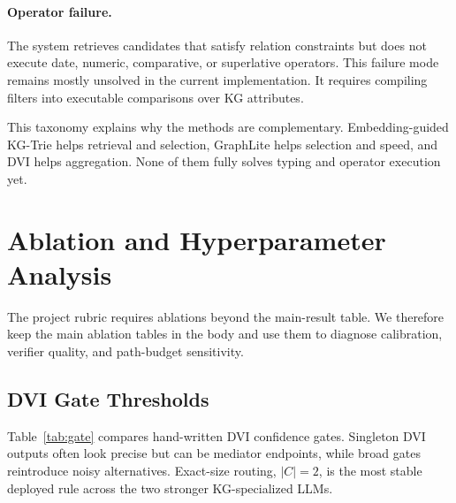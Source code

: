 \documentclass[10pt,twocolumn]{article}
\begin{document}
\paragraph{Operator failure.}
The system retrieves candidates that satisfy relation constraints but does not execute date, numeric, comparative, or superlative operators. This failure mode remains mostly unsolved in the current implementation. It requires compiling filters into executable comparisons over KG attributes.

This taxonomy explains why the methods are complementary. Embedding-guided KG-Trie helps retrieval and selection, GraphLite helps selection and speed, and DVI helps aggregation. None of them fully solves typing and operator execution yet.

\section{Ablation and Hyperparameter Analysis}
The project rubric requires ablations beyond the main-result table. We therefore keep the main ablation tables in the body and use them to diagnose calibration, verifier quality, and path-budget sensitivity.

\subsection{DVI Gate Thresholds}
Table~\ref{tab:gate} compares hand-written DVI confidence gates. Singleton DVI outputs often look precise but can be mediator endpoints, while broad gates reintroduce noisy alternatives. Exact-size routing, $|C|=2$, is the most stable deployed rule across the two stronger KG-specialized LLMs.

\begin{table}[H]
\centering
\scriptsize
{}
\caption{DVI confidence-gate ablation. Exact-size routing is the most stable threshold across the two stronger KG-specialized LLMs.}
\label{tab:gate}
\end{table}
\end{document}
